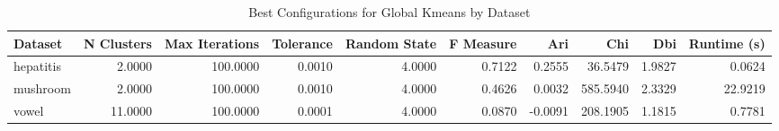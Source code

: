 \begin{table*}[ht!]
\caption{Best Configurations for Global Kmeans by Dataset}
\label{tab:best_configs_global_kmeans}
\begin{tabular}{lrrrrrrrrr}
Dataset & N Clusters & Max Iterations & Tolerance & Random State & F Measure & Ari & Chi & Dbi & Runtime (s) \\\midrule

hepatitis & 2.0000 & 100.0000 & 0.0010 & 4.0000 & 0.7122 & 0.2555 & 36.5479 & 1.9827 & 0.0624 \\
mushroom & 2.0000 & 100.0000 & 0.0010 & 4.0000 & 0.4626 & 0.0032 & 585.5940 & 2.3329 & 22.9219 \\
vowel & 11.0000 & 100.0000 & 0.0001 & 4.0000 & 0.0870 & -0.0091 & 208.1905 & 1.1815 & 0.7781 \\
\end{tabular}
\end{table*}
